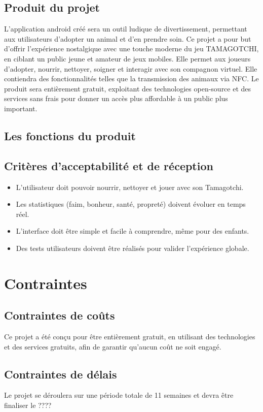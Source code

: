 \documentclass{rapportECL}
\begin{document}
\subsection{Produit du projet}
L’application android créé sera un outil ludique de divertissement, permettant aux utilisateurs d’adopter un animal et d’en prendre soin. Ce projet a pour but d’offrir l’expérience nostalgique avec une touche moderne du jeu TAMAGOTCHI, en ciblant un public jeune et amateur de jeux mobiles. Elle permet aux joueurs d’adopter, nourrir, nettoyer, soigner et interagir avec son compagnon virtuel. Elle contiendra des fonctionnalités telles que la transmission des animaux via NFC. Le produit sera entièrement gratuit, exploitant des technologies open-source et des services sans frais pour donner un accès plus affordable à un public plus important.
\subsection{Les fonctions du produit}
\subsection{Critères d’acceptabilité et de réception}
\begin{itemize}[label=\textbullet]
\item L'utilisateur doit pouvoir nourrir, nettoyer et jouer avec son Tamagotchi.
\item Les statistiques (faim, bonheur, santé, propreté) doivent évoluer en temps réel.
\item L'interface doit être simple et facile à comprendre, même pour des enfants.
\item Des tests utilisateurs doivent être réalisés pour valider l'expérience globale.
\end{itemize}
\section{Contraintes}
\subsection{Contraintes de coûts}
Ce projet a été conçu pour être entièrement gratuit, en utilisant des technologies et des services gratuits, afin de garantir qu'aucun coût ne soit engagé.
\subsection{Contraintes de délais}
Le projet se déroulera sur une période totale de 11 semaines et devra être finaliser le ????
\end{document}
